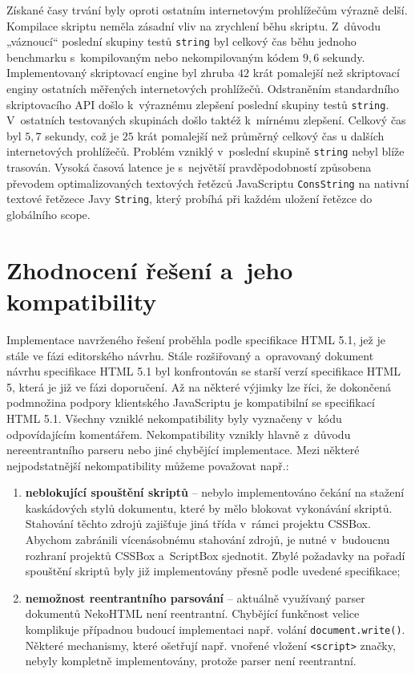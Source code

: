 Získané časy trvání byly oproti ostatním internetovým prohlížečům výrazně delší. Kompilace skriptu neměla zásadní vliv na zrychlení běhu skriptu. Z~důvodu „váznoucí“ poslední skupiny testů \texttt{string} byl celkový čas běhu jednoho benchmarku s~kompilovaným nebo nekompilovaným kódem $9,6$ sekundy. Implementovaný skriptovací engine byl zhruba $42$ krát pomalejší než skriptovací enginy ostatních měřených internetových prohlížečů. Odstraněním standardního skriptovacího API došlo k~výraznému zlepšení poslední skupiny testů \texttt{string}. V~ostatních testovaných skupinách došlo taktéž k~mírnému zlepšení. Celkový čas byl $5,7$ sekundy, což je $25$ krát pomalejší než průměrný celkový čas u dalších internetových prohlížečů. Problém vzniklý v~poslední skupině \texttt{string} nebyl blíže trasován. Vysoká časová latence je s~největší pravděpodobností způsobena převodem optimalizovaných textových řetězců JavaScriptu \texttt{ConsString} na nativní textové řetězece Javy \texttt{String}, který probíhá při každém uložení řetězce do globálního scope.

\section{Zhodnocení řešení a~jeho kompatibility}
\label{Chapter.RevaluationAndCompatibility}

Implementace navrženého řešení proběhla podle specifikace HTML 5.1, jež je stále ve fázi editorského návrhu. Stále rozšiřovaný a~opravovaný dokument návrhu specifikace HTML 5.1 byl konfrontován se starší verzí specifikace HTML 5, která je již ve fázi doporučení. Až na některé výjimky lze říci, že dokončená podmnožina podpory klientského JavaScriptu je kompatibilní se specifikací HTML 5.1. Všechny vzniklé nekompatibility byly vyznačeny v~kódu odpovídajícím komentářem. Nekompatibility vznikly hlavně z~důvodu nereentrantního parseru nebo jiné chybějící implementace. Mezi některé nejpodstatnější nekompatibility můžeme považovat např.:

\begin{enumerate}
  \item \textbf{neblokující spouštění skriptů} -- nebylo implementováno čekání na stažení kaskádových stylů dokumentu, které by mělo blokovat vykonávání skriptů. Stahování těchto zdrojů zajišťuje jiná třída v~rámci projektu CSSBox. Abychom zabránili vícenásobnému stahování zdrojů, je nutné v~budoucnu rozhraní projektů CSSBox a~ScriptBox sjednotit. Zbylé požadavky na pořadí spouštění skriptů byly již implementovány přesně podle uvedené specifikace;
  \item \textbf{nemožnost reentrantního parsování} -- aktuálně využívaný parser dokumentů NekoHTML není reentrantní. Chybějící funkčnost velice komplikuje případnou budoucí implementaci např. volání \texttt{document.write()}. Některé mechanismy, které ošetřují např. vnořené vložení \texttt{<script>} značky, nebyly kompletně implementovány, protože parser není reentrantní.
\end{enumerate}

